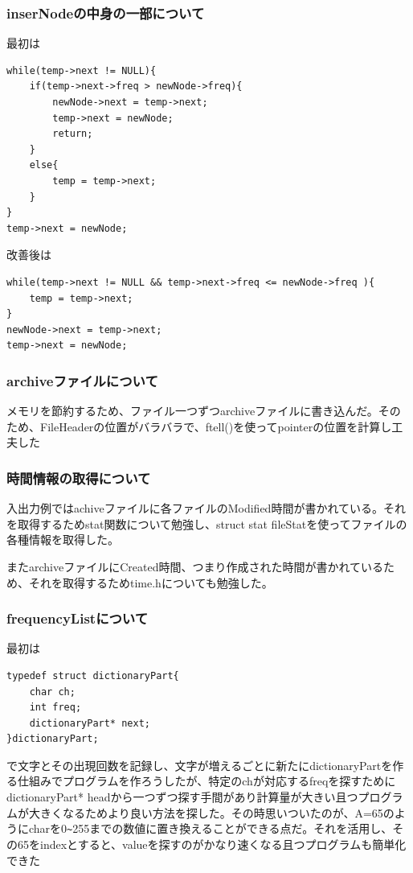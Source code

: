 \subsubsection{inserNodeの中身の一部について}
最初は
\begin{verbatim}
while(temp->next != NULL){
    if(temp->next->freq > newNode->freq){
        newNode->next = temp->next;
        temp->next = newNode;
        return;
    }
    else{
        temp = temp->next;
    }
}
temp->next = newNode;
\end{verbatim}
改善後は
\begin{verbatim}
while(temp->next != NULL && temp->next->freq <= newNode->freq ){
    temp = temp->next;
}
newNode->next = temp->next;
temp->next = newNode;
\end{verbatim}

\subsubsection{archiveファイルについて}
メモリを節約するため、ファイル一つずつarchiveファイルに書き込んだ。そのため、FileHeaderの位置がバラバラで、ftell()を使ってpointerの位置を計算し工夫した
\subsubsection{時間情報の取得について}
入出力例ではachiveファイルに各ファイルのModified時間が書かれている。それを取得するためstat関数について勉強し、struct stat fileStatを使ってファイルの各種情報を取得した。

またarchiveファイルにCreated時間、つまり作成された時間が書かれているため、それを取得するためtime.hについても勉強した。
\subsubsection{frequencyListについて}
最初は
\begin{verbatim}
typedef struct dictionaryPart{
    char ch;
    int freq;
    dictionaryPart* next;
}dictionaryPart;
\end{verbatim}
で文字とその出現回数を記録し、文字が増えるごとに新たにdictionaryPartを作る仕組みでプログラムを作ろうしたが、特定のchが対応するfreqを探すためにdictionaryPart* headから一つずつ探す手間があり計算量が大きい且つプログラムが大きくなるためより良い方法を探した。その時思いついたのが、A=65のようにcharを0\verb|~|255までの数値に置き換えることができる点だ。それを活用し、その65をindexとすると、valueを探すのがかなり速くなる且つプログラムも簡単化できた